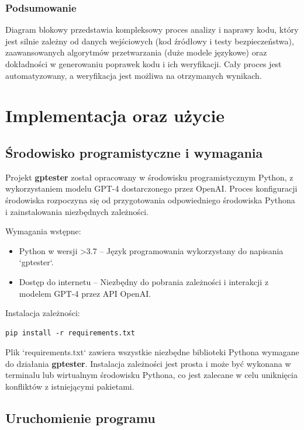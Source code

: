 \subsubsection{Podsumowanie}
Diagram blokowy przedstawia kompleksowy proces analizy i naprawy kodu, który jest silnie zależny od danych wejściowych (kod źródłowy i testy bezpieczeństwa), zaawansowanych algorytmów przetwarzania (duże modele językowe) oraz dokładności w generowaniu poprawek kodu i ich weryfikacji. Cały proces jest automatyzowany, a weryfikacja jest możliwa na otrzymanych wynikach.


\section{Implementacja oraz użycie}
\subsection{Środowisko programistyczne i wymagania}

Projekt \textbf{gptester} został opracowany w środowisku programistycznym Python, z wykorzystaniem modelu GPT-4 dostarczonego przez OpenAI. Proces konfiguracji środowiska rozpoczyna się od przygotowania odpowiedniego środowiska Pythona i zainstalowania niezbędnych zależności.

Wymagania wstępne:
\begin{itemize}
    \item Python w wersji >3.7 – Język programowania wykorzystany do napisania `gptester`.
    \item Dostęp do internetu – Niezbędny do pobrania zależności i interakcji z modelem GPT-4 przez API OpenAI.
\end{itemize}

Instalacja zależności:
\begin{listing}
    \begin{verbatim}
pip install -r requirements.txt
\end{verbatim}
\end{listing}

Plik `requirements.txt` zawiera wszystkie niezbędne biblioteki Pythona wymagane do działania \textbf{gptester}. 
Instalacja zależności jest prosta i może być wykonana w terminalu lub wirtualnym środowisku Pythona, co jest zalecane w celu uniknięcia konfliktów z istniejącymi pakietami.

\subsection{Uruchomienie programu}

